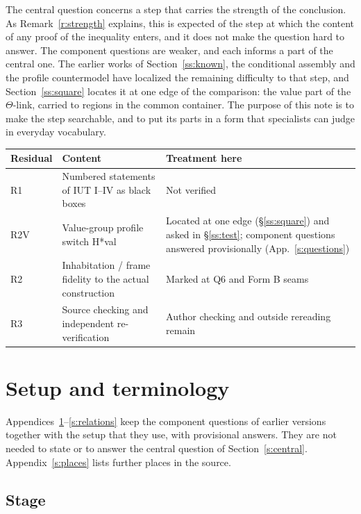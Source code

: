 \documentclass[11pt]{article}
\theoremstyle{definition}
\begin{document}
The central question concerns a step that carries the strength
of the conclusion.  As Remark~\ref{r:strength} explains, this is
expected of the step at which the content of any proof of the
inequality enters, and it does not make the question hard to
answer.  The component questions are weaker, and each informs a part
of the central one.  The earlier works of Section~\ref{ss:known},
the conditional assembly and the profile countermodel have localized
the remaining difficulty to that step, and Section~\ref{ss:square}
locates it at one edge of the comparison: the value part of the
$\Theta$-link, carried to regions in the common container.  The purpose of this note is
to make the step searchable, and to put its parts in a form that
specialists can judge in everyday vocabulary.

\begin{center}
\small
\begin{tabular}{@{}p{}p{}p{}@{}}
\toprule
Residual & Content & Treatment here\\
\midrule
R1 & Numbered statements of IUT I--IV as black boxes & Not verified\\
R2V & Value-group profile switch H*val & Located at one edge (\S\ref{ss:square}) and asked in \S\ref{ss:test}; component questions answered provisionally (App.~\ref{s:questions})\\
R2 & Inhabitation / frame fidelity to the actual construction & Marked at Q6 and Form B seams\\
R3 & Source checking and independent re-verification & Author checking and outside rereading remain\\
\bottomrule
\end{tabular}
\end{center}

\appendix

\section{Setup and terminology}\label{s:setup}

Appendices~\ref{s:setup}--\ref{s:relations} keep the component
questions of earlier versions together with the setup that they use,
with provisional answers.  They are not needed to state or to answer
the central question of Section~\ref{s:central}.
Appendix~\ref{s:places} lists further places in the source.

\subsection{Stage}\label{ss:stage}
\end{document}

